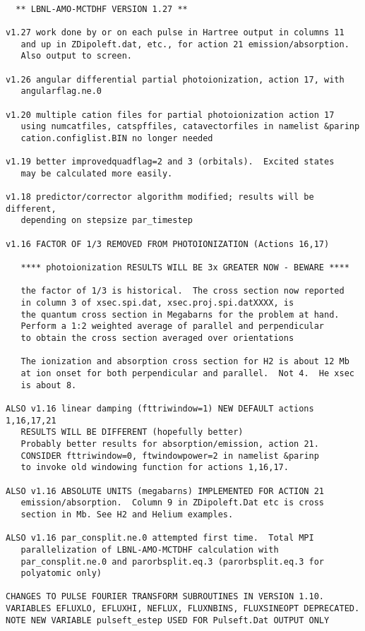 \begin{verbatim}

  ** LBNL-AMO-MCTDHF VERSION 1.27 **

v1.27 work done by or on each pulse in Hartree output in columns 11 
   and up in ZDipoleft.dat, etc., for action 21 emission/absorption.
   Also output to screen.

v1.26 angular differential partial photoionization, action 17, with
   angularflag.ne.0

v1.20 multiple cation files for partial photoionization action 17
   using numcatfiles, catspffiles, catavectorfiles in namelist &parinp
   cation.configlist.BIN no longer needed

v1.19 better improvedquadflag=2 and 3 (orbitals).  Excited states
   may be calculated more easily.

v1.18 predictor/corrector algorithm modified; results will be different,
   depending on stepsize par_timestep

v1.16 FACTOR OF 1/3 REMOVED FROM PHOTOIONIZATION (Actions 16,17)

   **** photoionization RESULTS WILL BE 3x GREATER NOW - BEWARE ****

   the factor of 1/3 is historical.  The cross section now reported
   in column 3 of xsec.spi.dat, xsec.proj.spi.datXXXX, is
   the quantum cross section in Megabarns for the problem at hand.
   Perform a 1:2 weighted average of parallel and perpendicular
   to obtain the cross section averaged over orientations

   The ionization and absorption cross section for H2 is about 12 Mb 
   at ion onset for both perpendicular and parallel.  Not 4.  He xsec
   is about 8.

ALSO v1.16 linear damping (fttriwindow=1) NEW DEFAULT actions 1,16,17,21
   RESULTS WILL BE DIFFERENT (hopefully better)
   Probably better results for absorption/emission, action 21.
   CONSIDER fttriwindow=0, ftwindowpower=2 in namelist &parinp
   to invoke old windowing function for actions 1,16,17.

ALSO v1.16 ABSOLUTE UNITS (megabarns) IMPLEMENTED FOR ACTION 21
   emission/absorption.  Column 9 in ZDipoleft.Dat etc is cross 
   section in Mb. See H2 and Helium examples.

ALSO v1.16 par_consplit.ne.0 attempted first time.  Total MPI 
   parallelization of LBNL-AMO-MCTDHF calculation with
   par_consplit.ne.0 and parorbsplit.eq.3 (parorbsplit.eq.3 for 
   polyatomic only)

CHANGES TO PULSE FOURIER TRANSFORM SUBROUTINES IN VERSION 1.10.
VARIABLES EFLUXLO, EFLUXHI, NEFLUX, FLUXNBINS, FLUXSINEOPT DEPRECATED.
NOTE NEW VARIABLE pulseft_estep USED FOR Pulseft.Dat OUTPUT ONLY


\end{verbatim}
